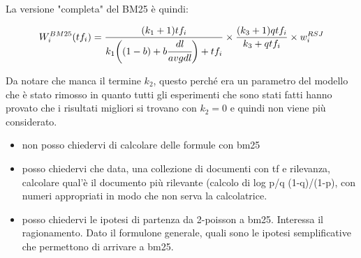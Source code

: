 La versione "completa" del BM25 è quindi:

\begin{align}
W_i^{BM25}(tf_i) = \frac{(k_1+1)tf_i}{k_1\bigg((1-b)+ b\cfrac{dl}{avgdl}\bigg) + tf_i } \times \frac{(k_3+1)qtf_i}{k_3 + qtf_i} \times w_i^{RSJ}
\end{align}

\noindent Da notare che manca il termine $k_2$, questo perché era un parametro del modello che è stato rimosso in quanto tutti gli esperimenti che sono stati fatti hanno provato che i risultati migliori si trovano con $k_2=0$ e quindi non viene più considerato.

\begin{itemize}
\item non posso chiedervi di  calcolare delle formule con bm25

\item posso chiedervi che data, una collezione di documenti con tf e rilevanza, calcolare qual'è il documento più rilevante (calcolo di log p/q (1-q)/(1-p), con numeri appropriati in modo che non serva la calcolatrice.

\item posso chiedervi le ipotesi di partenza da 2-poisson a bm25. Interessa il ragionamento. Dato il formulone generale, quali sono le ipotesi semplificative che permettono di arrivare a bm25.
\end{itemize}










